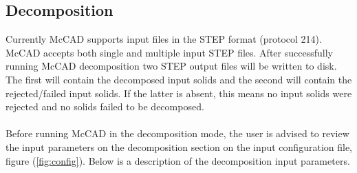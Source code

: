 \documentclass[12pt, a4paper, titlepage]{article}
\begin{document}
  \subsection{Decomposition}
    Currently McCAD supports input files in the STEP format (protocol 214). McCAD accepts both single and multiple input STEP files. After successfully running McCAD decomposition two STEP output files will be written to disk. The first will contain the decomposed input solids and the second will contain the rejected/failed input solids. If the latter is absent, this means no input solids were rejected and no solids failed to be decomposed. \\
    \\
    Before running McCAD in the decomposition mode, the user is advised to review the input parameters on the decomposition section on the input configuration file, figure (\ref{fig:config}). Below is a description of the decomposition input parameters.
\end{document}
